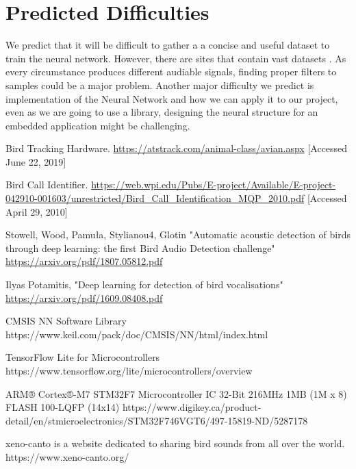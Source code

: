 \documentclass[12pt,journal,compsoc]{IEEEtran}
\begin{document}
\section{Predicted Difficulties}
We predict that it will be difficult to gather a a concise and useful dataset to train the neural network. However, there are sites that contain vast datasets \cite{Bird}. As every circumstance produces different audiable signals, finding proper filters to samples could be a major problem. Another major difficulty we predict is implementation of the  Neural Network and how we can apply it to our project, even as we are going to use a library, designing the neural structure for an embedded application might be challenging.



\begin{thebibliography}{1}

Bird Tracking Hardware.
\url{https://atstrack.com/animal-class/avian.aspx} [Accessed June 22, 2019]

Bird Call Identifier.
\url{https://web.wpi.edu/Pubs/E-project/Available/E-project-042910-001603/unrestricted/Bird_Call_Identification_MQP_2010.pdf} [Accessed April 29, 2010]

Stowell, Wood, Pamuła, Stylianou4, Glotin "Automatic acoustic detection of birds through deep learning: the first Bird Audio Detection challenge"
\url{https://arxiv.org/pdf/1807.05812.pdf}

Ilyas Potamitis, "Deep learning for detection of bird vocalisations"
\url{https://arxiv.org/pdf/1609.08408.pdf}

CMSIS NN Software Library
https://www.keil.com/pack/doc/CMSIS/NN/html/index.html

TensorFlow Lite for Microcontrollers
https://www.tensorflow.org/lite/microcontrollers/overview

ARM® Cortex®-M7 STM32F7 Microcontroller IC 32-Bit 216MHz 1MB (1M x 8) FLASH 100-LQFP (14x14)
https://www.digikey.ca/product-detail/en/stmicroelectronics/STM32F746VGT6/497-15819-ND/5287178

xeno-canto is a website dedicated to sharing bird sounds from all over the world.
https://www.xeno-canto.org/
\end{thebibliography}
\end{document}
